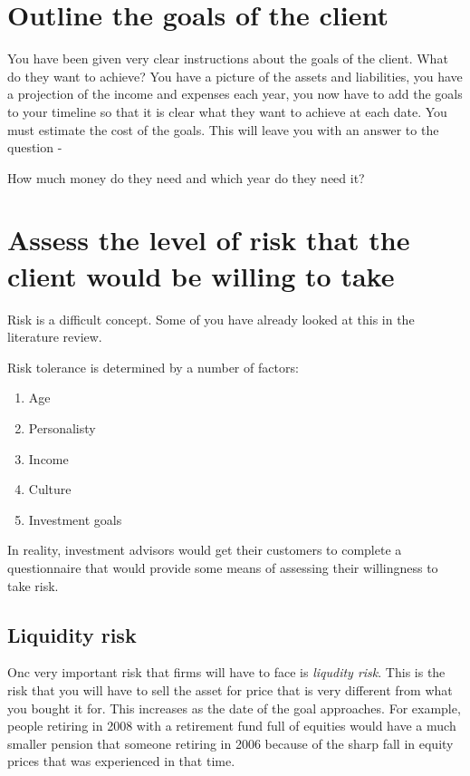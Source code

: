 \documentclass[12pt, a4paper, oneside]{article}\usepackage[]{graphicx}\usepackage[]{color}
\begin{document}
\section{Outline the goals of the client}
You have been given very clear instructions about the goals of the client.  What do they want to achieve?  You have a picture of the assets and liabilities, you have a projection of the income and expenses each year, you now have to add the goals to your timeline so that it is clear what they want to achieve at each date.  You must estimate the cost of the goals.  This will leave you with an answer to the question - 

How much money do they need and which year do they need it?

\section{Assess the level of risk that the client would be willing to take}
Risk is a difficult concept.  Some of you have already looked at this in the literature review.  

Risk tolerance is determined by a number of factors:
\begin{enumerate}
\item Age
\item Personalisty
\item Income
\item Culture
\item Investment goals
\end{enumerate}

In reality, investment advisors would get their customers to complete a questionnaire that would provide some means of assessing their willingness to take risk.  

\subsection{Liquidity risk}
Onc very important risk that firms will have to face is \emph{liqudity risk}.  This is the risk that you will have to sell the asset for price that is very different from what you bought it for.  This increases as the date of the goal approaches.  For example, people retiring in 2008 with a retirement fund full of equities would have a much smaller pension that someone retiring in 2006 because of the sharp fall in equity prices that was experienced in that time.
\end{document}
